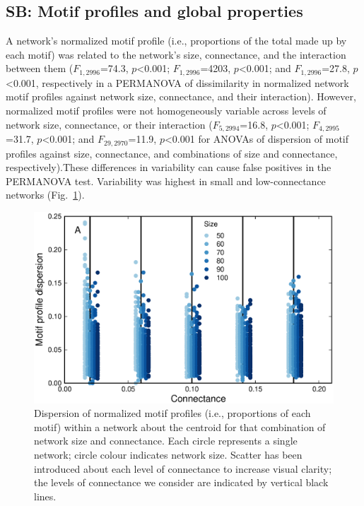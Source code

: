 \documentclass[12pt]{article}
\begin{document}
\begin{spacing}{2.0}
\clearpage


\section{SB: Motif profiles and global properties}


    A network's normalized motif profile (i.e., proportions of the total made up by each motif) was related to the network's size, connectance, and the interaction between them ($F_{1,2996}$=74.3, $p$\textless0.001; $F_{1,2996}$=4203, $p$\textless0.001; and $F_{1,2996}$=27.8, $p$\textless0.001, respectively in a PERMANOVA of dissimilarity in normalized network motif profiles against network size, connectance, and their interaction).
    However, normalized motif profiles were not homogeneously variable across levels of network size, connectance, or their interaction  ($F_{5,2994}$=16.8, $p$\textless0.001; $F_{4,2995}$=31.7, $p$\textless0.001; and $F_{29,2970}$=11.9, $p$\textless0.001 for ANOVAs of dispersion of motif profiles against size, connectance, and combinations of size and connectance, respectively).These differences in variability can cause false positives in the PERMANOVA test. Variability was highest in small and low-connectance networks (Fig.~\ref{dispersion_normmotifs}).


   \begin{figure}[h!]
       \centering
       \includegraphics[width=.75\textwidth]{figures/proportion_profile_dispersion.eps}
       \caption{Dispersion of normalized motif profiles (i.e., proportions of each motif) within a network about the centroid for that combination of network size and connectance. Each circle represents a single network; circle colour indicates network size. Scatter has been introduced about each level of connectance to increase visual clarity; the levels of connectance we consider are indicated by vertical black lines.}
       \label{dispersion_normmotifs}
    \end{figure}



\end{spacing}
\end{document}
